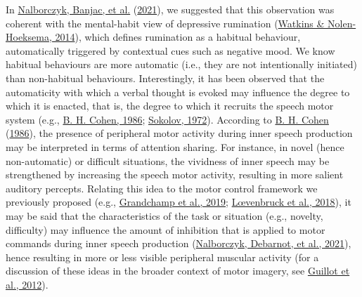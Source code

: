 \documentclass[
  english,
  man, donotrepeattitle,mask,floatsintext]{apa6}
\begin{document}
In \protect\hyperlink{ref-nalborczyk_dissociating_2021}{Nalborczyk, Banjac, et al.} (\protect\hyperlink{ref-nalborczyk_dissociating_2021}{2021}), we suggested that this observation was coherent with the mental-habit view of depressive rumination (\protect\hyperlink{ref-watkins_habit-goal_2014}{Watkins \& Nolen-Hoeksema, 2014}), which defines rumination as a habitual behaviour, automatically triggered by contextual cues such as negative mood. We know habitual behaviours are more automatic (i.e., they are not intentionally initiated) than non-habitual behaviours. Interestingly, it has been observed that the automaticity with which a verbal thought is evoked may influence the degree to which it is enacted, that is, the degree to which it recruits the speech motor system (e.g., \protect\hyperlink{ref-cohen_motor_1986}{B. H. Cohen, 1986}; \protect\hyperlink{ref-sokolov_inner_1972}{Sokolov, 1972}). According to \protect\hyperlink{ref-cohen_motor_1986}{B. H. Cohen} (\protect\hyperlink{ref-cohen_motor_1986}{1986}), the presence of peripheral motor activity during inner speech production may be interpreted in terms of attention sharing. For instance, in novel (hence non-automatic) or difficult situations, the vividness of inner speech may be strengthened by increasing the speech motor activity, resulting in more salient auditory percepts. Relating this idea to the motor control framework we previously proposed (e.g., \protect\hyperlink{ref-grandchamp_condialint_2019}{Grandchamp et al., 2019}; \protect\hyperlink{ref-loevenbruck_cognitive_2018}{Lœvenbruck et al., 2018}), it may be said that the characteristics of the task or situation (e.g., novelty, difficulty) may influence the amount of inhibition that is applied to motor commands during inner speech production (\protect\hyperlink{ref-nalborczyk_role_2021}{Nalborczyk, Debarnot, et al., 2021}), hence resulting in more or less visible peripheral muscular activity (for a discussion of these ideas in the broader context of motor imagery, see \protect\hyperlink{ref-guillot_imagining_2012}{Guillot et al., 2012}).
\end{document}
